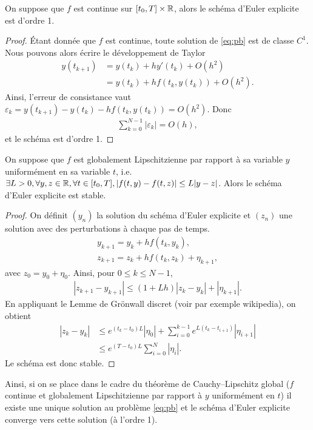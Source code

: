 \documentclass[12pt,a4paper,twoside]{article}
\begin{document}
\begin{proposition}
  On suppose que $f$ est continue sur $[t_0 , T] \times \mathbb{R}$,
  alors le sch\'ema d'Euler explicite est d'ordre 1.
\end{proposition}

\begin{proof}
  \'Etant donn\'ee que $f$ est continue, toute solution de \eqref{eq:pb}
  est de classe $C^1$.
  Nous pouvons alors \'ecrire le d\'eveloppement de Taylor
  \begin{align*}
    y(t_{k+1}) 
    &= y(t_k) + h y'(t_k) + O(h^2)
    \\
    &= y(t_k) + h f(t_k , y(t_k) ) + O(h^2) .
  \end{align*}
  Ainsi, l'erreur de consistance vaut
  $\varepsilon_k = y(t_{k+1}) - y(t_k) - h f(t_k,y(t_k)) = O(h^2)$.
  Donc 
  \begin{align*}
    \sum_{k=0}^{N-1} | \varepsilon_k | = O(h) ,
  \end{align*}
  et le sch\'ema est d'ordre 1.
\end{proof}


\begin{proposition}
  On suppose que $f$ est globalement Lipschitzienne par rapport \`a sa variable
  $y$ uniform\'ement en sa variable $t$, i.e. 
  $\exists L > 0, \forall y, z \in \mathbb{R}, \forall t \in [t_0,T], 
  | f(t,y) - f(t,z) | \leq L | y - z |$.
  Alors le sch\'ema d'Euler explicite est stable.
\end{proposition}

\begin{proof}
  On d\'efinit $(y_n)$ la solution du sch\'ema d'Euler explicite
  et $(z_n)$ une solution avec des perturbations \`a chaque pas de temps.
  \begin{align*}
    y_{k+1} = y_k + h f(t_k,y_k) , 
    \\
    z_{k+1} = z_k + h f(t_k,z_k) + \eta_{k+1} ,
  \end{align*}
  avec $z_0 = y_0 + \eta_0$.
  Ainsi, pour $0 \leq k \leq N-1$,
  \begin{align*}
    | z_{k+1} - y_{k+1} | \leq (1+Lh) |z_k - y_k| + | \eta_{k+1}| .
  \end{align*}
  En appliquant le Lemme de Gr\"onwall discret (voir par exemple wikipedia),
  on obtient
  \begin{align*}
    |z_k - y_k|
    & \leq e^{(t_k - t_0) L} |\eta_0| + \sum_{i=0}^{k-1} e^{L(t_{k}-t_{i+1})} |\eta_{i+1}|
    \\
    & \leq e^{(T-t_0) L} \sum_{i=0}^{N} |\eta_i| .
  \end{align*}
  Le sch\'ema est donc stable.
\end{proof}

Ainsi, si on se place dans le cadre du th\'eor\`eme de Cauchy--Lipschitz global
($f$ continue et globalement Lipschitzienne par rapport \`a $y$ uniform\'ement en $t$)
il existe une unique solution au probl\`eme \eqref{eq:pb} et le sch\'ema
d'Euler explicite converge vers cette solution (\`a l'ordre 1).

\end{document}
